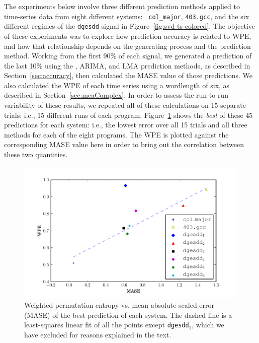 The experiments below involve three different prediction methods
applied to time-series data from eight different systems: {\tt
  col\_major}, {\tt 403.gcc}, and the six different regimes of the
{\tt dgesdd} signal in Figure~\ref{fig:svd-ts-colored}.  The objective of these
experiments was to explore how prediction accuracy is related to WPE,
and how that relationship depends on the generating process and the
prediction method.  Working from the first 90\% of each signal, we
generated a prediction of the last 10\% using the \naive, ARIMA, and
LMA prediction methods, as described in Section~\ref{sec:accuracy},
then calculated the MASE value of those predictions.  We also
calculated the WPE of each time series using a wordlength of six, as
described in Section~\ref{sec:meaComplex}.  In order to assess the
run-to-run variability of these results, we repeated all of these
calculations on 15 separate trials: i.e., 15 different runs of each
program.  Figure~\ref{fig:wpe_vs_mase_best} shows the {\sl best} of
these 45 predictions for each system: i.e., the lowest error over all
15 trials and all three methods for each of the eight programs.  The
WPE is plotted against the corresponding MASE value here in order to
bring out the correlation between these two quantities.
\begin{figure}[htbp]
  \centering
  \includegraphics[width=\columnwidth]{figs/prediction_vs_entropy}
  \caption{Weighted permutation entropy vs. mean absolute scaled error
    (MASE) of the best prediction of each system.
% 
% 
The dashed line is a least-squares linear fit of all the points except
{\tt dgesdd$_1$}, which we have excluded for reasons explained in the
text.}
  \label{fig:wpe_vs_mase_best}
\end{figure}


